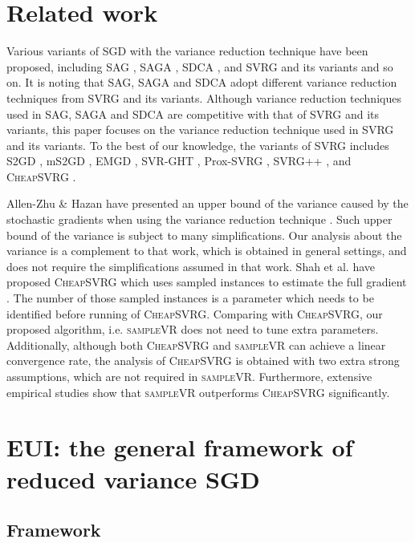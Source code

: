 \documentclass[letterpaper]{article}
\begin{document}
\section{Related work}
\label{sect_related_work}
Various variants of  SGD with the variance reduction technique have been proposed, including SAG \cite{Schmidt:2013ui}, SAGA \cite{Defazio:2014vu}, SDCA \cite{ShalevShwartz:2016vy}, and SVRG \cite{Johnson:9MAvkbgy} and its variants and so on. It is noting that SAG, SAGA and SDCA adopt different variance reduction techniques from SVRG and its variants. Although variance reduction techniques used in SAG, SAGA and SDCA are competitive with that of SVRG and its variants,  this paper focuses on the variance reduction technique used in SVRG and its variants. To the best of our knowledge,  the variants of SVRG includes S2GD \cite{Richtarik:2013te}, mS2GD \cite{Liu:2015bx}, EMGD \cite{Zhang2013Linear}, SVR-GHT \cite{Li:2016vh}, Prox-SVRG \cite{Xiao:2014vw}, SVRG++ \cite{Allen2015Improved}, and \textsc{CheapSVRG} \cite{Shah2016Trading}. 

Allen-Zhu \& Hazan have presented an upper bound of the variance caused by the stochastic gradients when using the variance reduction technique \cite{AllenZhu:2016up}. Such upper bound of the variance is subject to  many simplifications. Our analysis about the variance is a complement to that work, which is obtained in general settings, and does not require the simplifications assumed in that work. Shah et al. have proposed \textsc{CheapSVRG} which uses sampled instances to estimate the full gradient \cite{Shah2016Trading}. The number of those sampled instances is a parameter which needs to be identified before running of \textsc{CheapSVRG}. Comparing with \textsc{CheapSVRG}, our proposed algorithm, i.e. \textsc{sampleVR} does not need to tune extra parameters. Additionally, although both \textsc{CheapSVRG} and \textsc{sampleVR} can achieve a linear convergence rate, the analysis of \textsc{CheapSVRG} is obtained with two extra strong assumptions, which are not required in \textsc{sampleVR}. Furthermore, extensive empirical studies show that  \textsc{sampleVR} outperforms \textsc{CheapSVRG} significantly.
 

\section{EUI: the general framework of reduced variance SGD}
\label{sect_framework}
\subsection{Framework}
\end{document}
